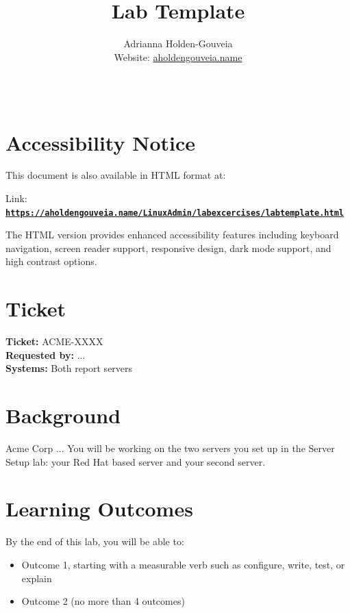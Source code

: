 \documentclass[12pt]{article}
\title{Lab Template}
\author{
        Adrianna Holden-Gouveia \\
        Website: \href{https://aholdengouveia.name}{aholdengouveia.name}\\ 
        \date{\vspace{-5ex}}
        \faGithub {: aholdengouveia} \\
        }
\begin{document}
    

\maketitle



\section*{Accessibility Notice}
This document is also available in HTML format at:

Link: \href{https://aholdengouveia.name/LinuxAdmin/labexcercises/labtemplate.html}{\textbf{\nolinkurl{https://aholdengouveia.name/LinuxAdmin/labexcercises/labtemplate.html}}}

The HTML version provides enhanced accessibility features including keyboard navigation, screen reader support, responsive design, dark mode support, and high contrast options.


\section*{Ticket}
\noindent\textbf{Ticket:} ACME-XXXX\\
\textbf{Requested by:} ...\\
\textbf{Systems:} Both report servers

\section*{Background}
Acme Corp ... You will be working on the two servers you set up in the Server Setup lab: your Red Hat based server and your second server.

\section*{Learning Outcomes}
By the end of this lab, you will be able to:
\begin{itemize}
    \item Outcome 1, starting with a measurable verb such as configure, write, test, or explain
    \item Outcome 2 (no more than 4 outcomes)
\end{itemize}
\end{document}
